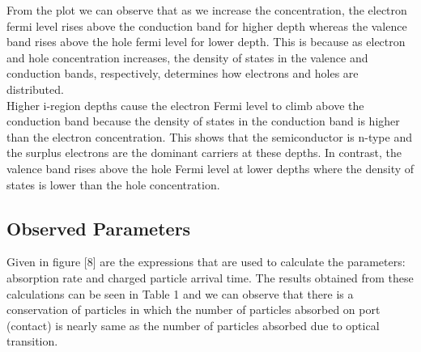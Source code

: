 \documentclass[conference]{IEEEtran}
\begin{document}
From the plot we can observe that as we increase the concentration, the electron fermi level rises above the conduction band for higher depth whereas the valence band rises above the hole fermi level for lower depth. This is because as electron and hole concentration increases, the density of states in the valence and conduction bands, respectively, determines how electrons and holes are distributed.\\

Higher i-region depths cause the electron Fermi level to climb above the conduction band because the density of states in the conduction band is higher than the electron concentration. This shows that the semiconductor is n-type and the surplus electrons are the dominant carriers at these depths. In contrast, the valence band rises above the hole Fermi level at lower depths where the density of states is lower than the hole concentration.

\subsection{Observed Parameters}

Given in figure [8] are the expressions that are used to calculate the parameters: absorption rate and charged particle arrival time. The results obtained from these calculations can be seen in Table 1 and we can observe that there is a conservation of particles in which the number of particles absorbed on port (contact) is nearly same as the number of particles absorbed due to optical transition.
\end{document}
